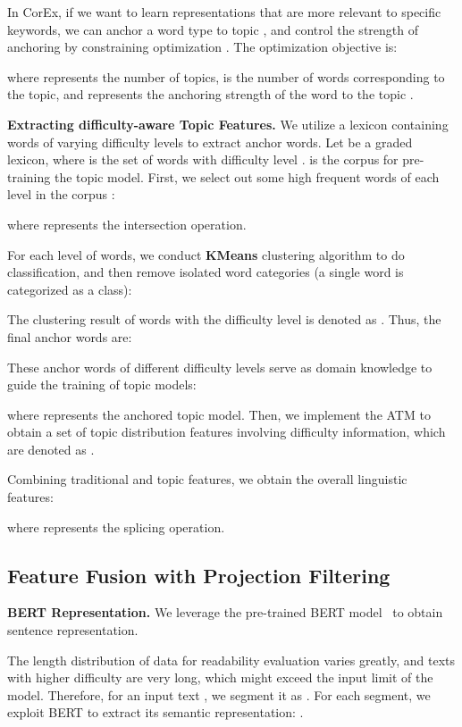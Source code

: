 \documentclass[11pt]{article}
\begin{document}
In CorEx, if we want to learn representations that are more relevant to specific keywords, we can anchor a word type  to topic , and control the strength of anchoring by constraining optimization . The optimization objective is:

where  represents the number of topics,  is the number of words corresponding to the topic, and  represents the anchoring strength of the word  to the topic .


\noindent\textbf{Extracting difficulty-aware Topic Features.}
We utilize a lexicon containing words of varying difficulty levels to extract anchor words. Let  be a graded lexicon, where  is the set of words with difficulty level .  is the corpus for pre-training the topic model. First, we select out some high frequent words of each level in the corpus :


where  represents the intersection operation.

For each level of words, we conduct \textbf{KMeans} clustering algorithm to do classification, and then remove isolated word categories (a single word is categorized as a class):

The clustering result of words with the difficulty level  is denoted as . Thus, the final anchor words are:


These anchor words of different difficulty levels serve as domain knowledge to guide the training of topic models:


where  represents the anchored topic model.
Then, we implement the ATM to obtain a set of topic distribution features involving difficulty information, which are denoted as .


Combining traditional and topic features, we obtain the overall linguistic features:

where  represents the splicing operation.


\subsection{Feature Fusion with Projection Filtering}
\textbf{BERT Representation.} We leverage the pre-trained BERT model~\cite{devlin2018bert} to obtain sentence representation.

The length distribution of data for readability evaluation varies greatly, and texts with higher difficulty are very long, which might exceed the input limit of the model. Therefore, for an input text , we segment it as . For each segment, we exploit BERT to extract its semantic representation: .
\end{document}
